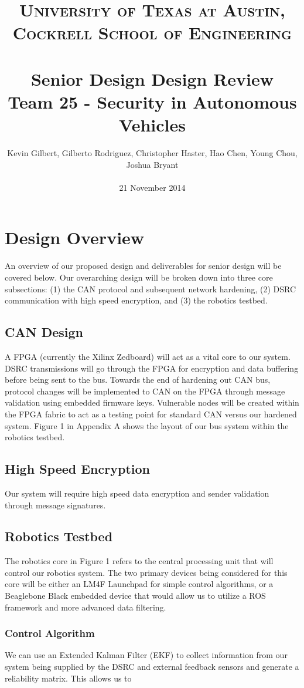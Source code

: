 \documentclass[paper=a4, fontsize=11pt]{scrartcl}
\title{
		\usefont{OT1}{bch}{b}{n}
		\normalfont \normalsize \textsc{University of Texas at Austin, Cockrell School of Engineering} \\ [25pt]
		\horrule{0.5pt} \\[0.4cm]
		\huge Senior Design Design Review\\
        Team 25 - Security in Autonomous Vehicles
		\horrule{2pt} \\[0.5cm]
}
\author{
		\normalfont \normalsize
        Kevin Gilbert, Gilberto Rodriguez, Christopher Haster, Hao Chen, Young Chou, Joshua Bryant\\[-3pt]\\
        \normalsize
        21 November 2014
}
\date{}
\numberwithin{equation}{section}		%
\numberwithin{figure}{section}			%
\numberwithin{table}{section}				%
\begin{document}
\maketitle

\newpage

\section{Design Overview}
An overview of our proposed design and deliverables for senior design will be covered below. Our overarching design will be broken down into three core subsections: (1) the CAN protocol and subsequent network hardening, (2) DSRC communication with high speed encryption, and (3) the robotics testbed.

\subsection{CAN Design}
A FPGA (currently the Xilinx Zedboard) will act as a vital core to our system. DSRC transmissions will go through the FPGA for encryption and data buffering before being sent to the bus. Towards the end of hardening out CAN bus, protocol changes will be implemented to CAN on the FPGA through message validation using embedded firmware keys. Vulnerable nodes will be created within the FPGA fabric to act as a testing point for standard CAN versus our hardened system. Figure 1 in Appendix A shows the layout of our bus system within the robotics testbed.

\subsection{High Speed Encryption}
Our system will require high speed data encryption and sender validation through message signatures. 

\subsection{Robotics Testbed}
The robotics core in Figure 1 refers to the central processing unit that will control our robotics system. The two primary devices being considered for this core will be either an LM4F Launchpad for simple control algorithms, or a Beaglebone Black embedded device that would allow us to utilize a ROS framework and more advanced data filtering.

\subsubsection{Control Algorithm}
We can use an Extended Kalman Filter (EKF) to collect information from our system being supplied by the DSRC and external feedback sensors and generate a reliability matrix. This allows us to 
\end{document}
